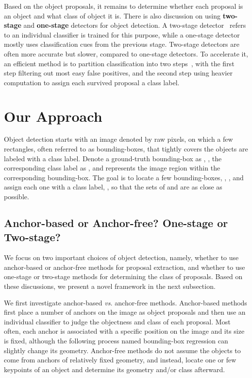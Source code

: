 \documentclass[runningheads]{llncs}
\begin{document}
Based on the object proposals, it remains to determine whether each proposal is an object and what class of object it is. There is also discussion on using \textbf{two-stage} and \textbf{one-stage} detectors for object detection. A two-stage detector~\cite{ren2015faster,he2017mask,cai2018cascade,pang2019libra,li2019scale} refers to an individual classifier is trained for this purpose, while a one-stage detector~\cite{redmon2016you,liu2016ssd,lin2017focal,zhang2018single,chen2019revisiting} mostly uses classification cues from the previous stage. Two-stage detectors are often more accurate but slower, compared to one-stage detectors. To accelerate it, an efficient method is to partition classification into two steps~\cite{dai2016r,lin2017feature,he2017mask,cai2018cascade,pang2019libra}, with the first step filtering out most easy false positives, and the second step using heavier computation to assign each survived proposal a class label.
\section{Our Approach}
\label{Approach}
Object detection starts with an image  denoted by raw pixels, on which a few rectangles, often referred to as bounding-boxes, that tightly covers the objects are labeled with a class label. Denote a ground-truth bounding-box as , , the corresponding class label as , and  represents the image region within the corresponding bounding-box. The goal is to locate a few bounding-boxes, , , and assign each one with a class label, , so that the sets of  and  are as close as possible.
\vspace{-2ex}
\subsection{Anchor-based or Anchor-free? One-stage or Two-stage?}
\label{Approach:Choices}

We focus on two important choices of object detection, namely, whether to use anchor-based or anchor-free methods for proposal extraction, and whether to use one-stage or two-stage methods for determining the class of proposals. Based on these discussions, we present a novel framework in the next subsection.

We first investigate anchor-based \textit{vs.} anchor-free methods. Anchor-based methods first place a number of anchors on the image as object proposals and then use an individual classifier to judge the objectness and class of each proposal. Most often, each anchor is associated with a specific position on the image and its size is fixed, although the following process named bounding-box regression can slightly change its geometry. Anchor-free methods do not assume the objects to come from anchors of relatively fixed geometry, and instead, locate one or few keypoints of an object and determine its geometry and/or class afterward.
\end{document}
